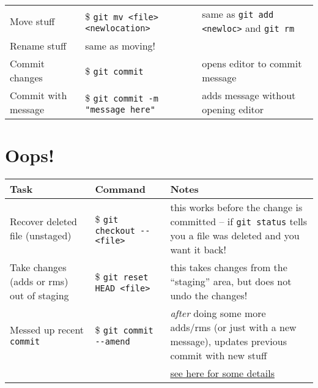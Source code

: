 \documentclass[]{article}
\begin{document}
\begin{center}
\begin{tabular}{llp{2.5in}}
 Move stuff           &  \$ \texttt{git mv <file> <newlocation>}            &  same as \texttt{git add <newloc>} and \texttt{git rm}                          \\
 Rename stuff         &  same as moving!                                    &                                                                                 \\
 Commit changes       &  \$ \texttt{git commit}                             &  opens editor to commit message                                                 \\
 Commit with message  &  \$ \texttt{git commit -m} \texttt{"message here"}  &  adds message without opening editor                                            \\
\end{tabular}
\end{center}
\section*{Oops!}
\label{sec-2}


\begin{center}
\begin{tabular}{llp{2.5in}}
 Task                                       &  Command                               &  Notes                                                                                                                   \\
\hline
 Recover deleted file (unstaged)            &  \$ \texttt{git checkout -{}- <file>}  &  this works before the change is committed -- if \texttt{git status} tells you a file was deleted and you want it back!  \\
 Take changes (adds or rms) out of staging  &  \$ \texttt{git reset HEAD <file>}     &  this takes changes from the ``staging'' area, but does not undo the changes!                                            \\
 Messed up recent \texttt{commit}           &  \$ \texttt{git commit -{}-amend}      &  \emph{after} doing some more adds/rms (or just with a new message), updates previous commit with new stuff              \\
                                            &                                        &  \href{http://git-scm.com/book/en/Git-Basics-Undoing-Things}{see here for some details}                                  \\
\end{tabular}
\end{center}
\end{document}
